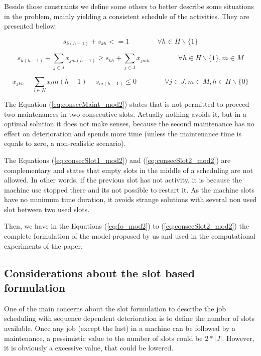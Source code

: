 \documentclass[a4paper,11pt]{article}
\begin{document}
Beside those constraints we define some others to better describe some situations in the problem, mainly yielding a consistent schedule of the activities. They are presented bellow:

\begin{equation}\label{eq:consecMaint_mod2}
	s_{k(h-1)} + s_{kh} <= 1  \quad \quad \quad \quad \forall h \in H\backslash\{1\}
\end{equation}

\begin{equation}\label{eq:consecSlot1_mod2}
	s_{k(h-1)} + \sum_{j \in J}{x_{jm(h-1)}} \geq 	s_{kh} + \sum_{j \in J}{x_{jmh}}  \quad \quad \quad \quad \forall h \in H\backslash\{1\}, m \in M
\end{equation}

\begin{equation}\label{eq:consecSlot2_mod2}
	x_{jkh} - \sum_{l \in N}{x_lm(h-1)} - s_{m(h-1)} \leq 0    \quad \quad \quad \quad \forall j \in J, m \in M, h \in H\backslash\{0\}
\end{equation}

The Equation (\ref{eq:consecMaint_mod2}) states that is not permitted to proceed two maintenances in two consecutive slots. Actually nothing avoids it, but in a optimal solution it does not make senses, because the second maintenance has no effect on deterioration and spends more time (unless the maintenance time is equals to zero, a non-realistic scenario). 

The Equations (\ref{eq:consecSlot1_mod2}) and (\ref{eq:consecSlot2_mod2}) are complementary and states that empty slots in the middle of a scheduling are not allowed. In other words, if the previous slot has not activity, it is because the machine use stopped there and its not possible to restart it. As the machine slots have no minimum time duration, it avoids strange solutions with several non used slot between two used slots. 

Then, we have in the Equations (\ref{eq:fo_mod2}) to (\ref{eq:consecSlot2_mod2}) the complete formulation of the model proposed by us and used in the computational experiments of the paper. 



\subsection{Considerations about the slot based formulation}
One of the main concerns about the slot formulation to describe the job scheduling with sequence dependent deterioration is to define the number of slots available. Once any job (except the last) in a machine can be followed by a maintenance, a pessimistic value to the number of slots could be $2*|J|$. However, it is obviously a excessive value, that could be lowered. 
\end{document}

